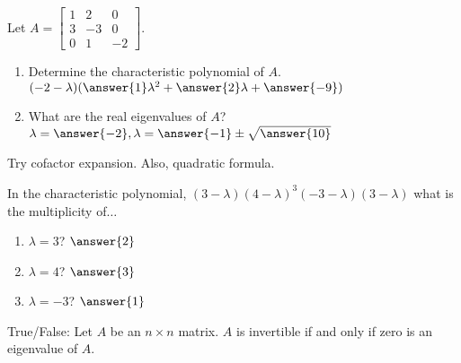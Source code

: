 \documentclass{ximera}
\begin{document}
  	  		      \begin{question} Let $A= \begin{bmatrix} 1&2&0 \\3&-3&0\\ 0&1&-2\end{bmatrix}$.\\
  	  		      	
  	  		      	\begin{enumerate}
  	  		      		\item Determine the characteristic polynomial of $A$. \\
  	  		      		
  	  		      	$(-2-\lambda)(\answer{1}\lambda^2+\answer{2}\lambda+\answer{-9})$\\
  	  		      		
  	  		      		\item What are the real eigenvalues of $A$?\\
  	  		      		
  	  		      	$\lambda = \answer{-2}, \lambda = \answer{-1}\pm \sqrt{\answer{10}}$
  	  		      	\end{enumerate}
  	  		      	\begin{hint}
  	  		      		Try cofactor expansion. Also, quadratic formula.
  	  		      	\end{hint}
  	  		      \end{question}	
  	  		     \begin{question} In the characteristic polynomial, $(3-\lambda)(4-\lambda)^3(-3-\lambda)(3-\lambda)$ what is the multiplicity of$\dots$\\
  	  		     	
  	  		     	\begin{enumerate}
  	  		     		\item $\lambda = 3$? $\answer{2}$\\
  	  		     		
  	  		     		\item $\lambda = 4$? $\answer{3}$\\
  	  		     		\item $\lambda = -3$? $\answer{1}$\\
  	  		     	\end{enumerate}
  	  		     	
  	  		     \end{question}	
  	  		      \begin{question} True/False: Let $A$ be an $n\times n$ matrix. $A$ is invertible if and only if zero is an eigenvalue of $A$.
  	  		      	
  	  		      \begin{multipleChoice}
  	  		      	\end{multipleChoice}
  	  		      	
  	  		      \end{question}	
  
\end{document}
